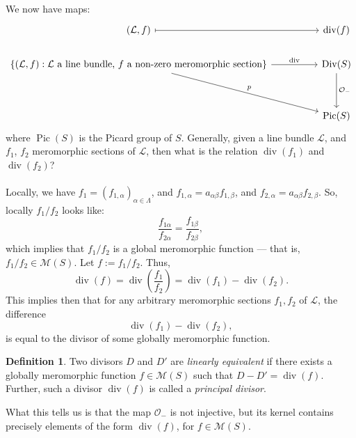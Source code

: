 \documentclass[a4paper]{report}
\theoremstyle{definition}
\newtheorem{definition}{Definition}
\theoremstyle{remark}
\theoremstyle{proposition}
\theoremstyle{conjecture}
\theoremstyle{lemma}
\theoremstyle{corollary}
\theoremstyle{exercise}
\theoremstyle{example}
\newcommand{\mcal}{\mathcal}
\newcommand{\on}{\operatorname}
\begin{document}
We now have maps:
$$\begin{tikzcd}
    (\mcal{L},f) \arrow[rr, maps to]                                                                                                                                                   &  & \operatorname{div}(f)                             \\
{\left\lbrace (\mathcal{L},f) : \text{$\mathcal{L}$ a line bundle, $f$ a non-zero meromorphic section}\right\rbrace} \arrow[rr, "\operatorname{div}"] \arrow[rrdd, "p"] &  & \operatorname{Div}(S) \arrow[dd, "\mathcal{O}_-"] \\
                                                                                                                                                               &  &                                                   \\
                                                                                                                                                               &  & \operatorname{Pic}(S)                            
\end{tikzcd}$$
where $\on{Pic}(S)$ is the Picard group of $S$.
Generally, given a line bundle $\mcal{L}$, and 
$f_1$, $f_2$ meromorphic sections of $\mcal{L}$, then what is the relation
$\on{div}(f_1)$ and $\on{div}(f_2)$?\\\\
Locally, we have
$f_1=(f_{1,\alpha})_{\alpha\in\Lambda}$, and 
$f_{1,\alpha}=a_{\alpha\beta}f_{1,\beta}$, and 
$f_{2,\alpha} = a_{\alpha\beta}f_{2,\beta}$.
So, locally $f_1/f_2$ looks like:
$$\frac{f_{1\alpha}}{f_{2\alpha}} = \frac{f_{1\beta}}{f_{2\beta}},$$
which implies that $f_1/f_2$ is a global meromorphic function --- that is,
$f_1/f_2 \in \mcal{M}(S)$. Let $f := f_1/f_2$.
Thus, 
$$\on{div}(f) = \on{div}\left(\frac{f_1}{f_2}\right) = \on{div}(f_1) - \on{div}(f_2).$$
This implies then that for any arbitrary meromorphic sections 
$f_1,f_2$ of $\mcal{L}$, the difference
$$\on{div}(f_1) - \on{div}(f_2),$$
is equal to the divisor of some globally meromorphic function.

\begin{definition}
    Two divisors $D$ and $D'$ are \emph{linearly equivalent} if there 
    exists a globally meromorphic function $f\in\mcal{M}(S)$ such that 
    $D-D' = \on{div}(f)$. Further, such a divisor $\on{div}(f)$ is 
    called a \emph{principal divisor}.
\end{definition}

What this tells us is that the map $\mcal{O}_-$ is not injective, 
but its kernel contains precisely elements of the form $\on{div}(f)$,
for $f\in\mcal{M}(S)$.
\end{document}
